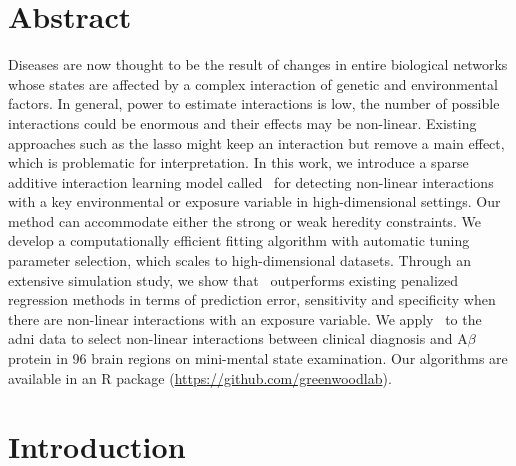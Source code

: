 \newpage

\section*{Abstract}
Diseases are now thought to be the result of changes in entire biological networks whose states are affected by a complex interaction of genetic and environmental factors. In general, power to estimate interactions is low, the number of possible interactions could be enormous and their effects may be non-linear. Existing approaches such as the lasso might keep an interaction but remove a main effect, which is problematic for interpretation. In this work, we introduce a sparse additive interaction learning model called \sail ~for detecting non-linear interactions with a key environmental or exposure variable in high-dimensional settings. Our method can accommodate either the strong or weak heredity constraints. We develop a computationally efficient fitting algorithm with automatic tuning parameter selection, which scales to high-dimensional datasets. Through an extensive simulation study, we show that \sail ~outperforms existing penalized regression methods in terms of prediction error, sensitivity and specificity when there are non-linear interactions with an exposure variable. We apply \sail ~to the \ac{adni} data to select non-linear interactions between clinical diagnosis and A$\beta$ protein in 96 brain regions on mini-mental state examination. Our algorithms are available in an R package (\url{https://github.com/greenwoodlab}).

\newpage

\section{Introduction}

